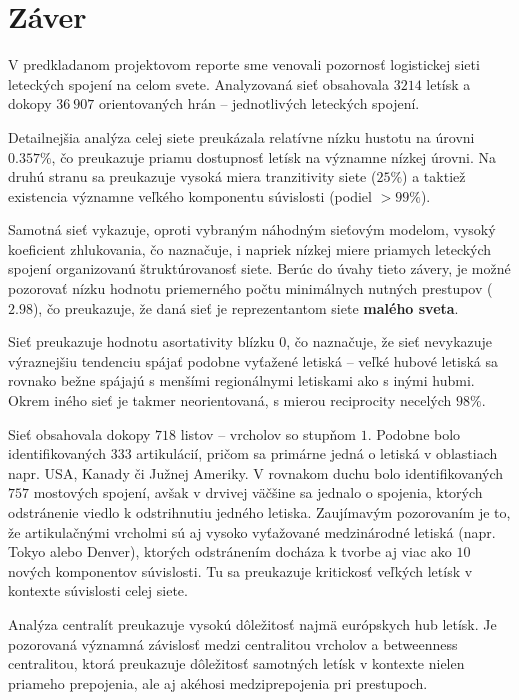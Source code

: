 \chapter{Záver}

V predkladanom projektovom reporte sme venovali pozornosť logistickej 
sieti leteckých spojení na celom svete. Analyzovaná sieť obsahovala $3214$ letísk
a dokopy $36 \> 907$ orientovaných hrán -- jednotlivých leteckých spojení.

Detailnejšia analýza celej siete preukázala relatívne nízku hustotu na úrovni $0.357 \%$, čo preukazuje
priamu dostupnosť letísk na významne nízkej úrovni. Na druhú stranu sa preukazuje vysoká miera tranzitivity siete ($25 \%$)
a taktiež existencia významne veľkého komponentu súvislosti (podiel $> 99 \%$).

Samotná sieť vykazuje, oproti vybraným náhodným sieťovým modelom, vysoký koeficient zhlukovania, čo naznačuje, i napriek nízkej miere 
priamych leteckých spojení organizovanú štruktúrovanosť siete. Berúc do úvahy tieto závery, je možné pozorovať nízku hodnotu priemerného
počtu minimálnych nutných prestupov ($2.98$), čo preukazuje, že daná sieť je reprezentantom siete \textbf{malého sveta}.

Sieť preukazuje hodnotu asortativity blízku $0$, čo naznačuje, že sieť nevykazuje výraznejšiu tendenciu spájať podobne vyťažené letiská -- veľké
hubové letiská sa rovnako bežne spájajú s menšími regionálnymi letiskami ako s inými hubmi. Okrem iného sieť je takmer neorientovaná, s mierou reciprocity necelých 
$98 \%$.

Sieť obsahovala dokopy $718$ listov -- vrcholov so stupňom $1$. Podobne bolo identifikovaných $333$ artikulácií, pričom sa primárne jedná o letiská v oblastiach napr. USA, Kanady či Južnej Ameriky.
V rovnakom duchu bolo identifikovaných $757$ mostových spojení, avšak v drvivej väčšine sa jednalo o spojenia, ktorých odstránenie viedlo k odstrihnutiu jedného letiska. 
Zaujímavým pozorovaním je to, že artikulačnými vrcholmi sú aj vysoko vyťažované medzinárodné letiská (napr. Tokyo alebo Denver), ktorých odstránením docháza k tvorbe aj viac ako $10$ nových komponentov súvislosti.
Tu sa preukazuje kritickosť veľkých letísk v kontexte súvislosti celej siete.

Analýza centralít preukazuje vysokú dôležitosť najmä európskych hub letísk. Je pozorovaná významná závislosť medzi centralitou vrcholov a betweenness centralitou, ktorá preukazuje dôležitosť
samotných letísk v kontexte nielen priameho prepojenia, ale aj akéhosi medziprepojenia pri prestupoch.